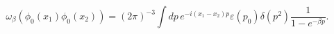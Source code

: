 \begin{equation} \label{freekms}
\omega_\beta (\phi_0 (x_1) \phi_0 (x_2)) =
(2 \pi)^{-3} \int \! dp \,
e^{-i(x_1-x_2)p} \varepsilon (p_{0})\delta (p^{2})
\frac{1}{1-e^{-\beta p}}.
\end{equation}

